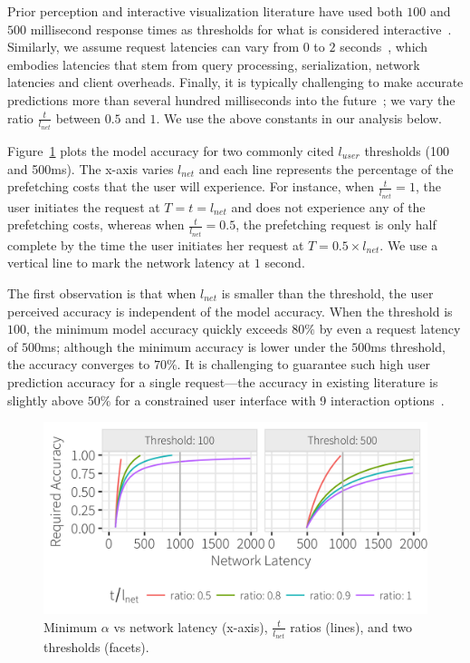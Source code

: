 Prior perception and interactive visualization literature have used both $100$ and $500$ millisecond response times as thresholds for what is considered interactive~\cite{liu2014effects}.   Similarly, we assume request latencies can vary from $0$ to $2$ seconds~\cite{}, which embodies latencies that stem from query processing, serialization, network latencies and client overheads.  Finally, it is typically challenging to make accurate predictions more than several hundred milliseconds into the future~\cite{pasqual2014mouse}; we vary the ratio $\frac{t}{l_{net}}$ between $0.5$ and $1$.   We use the above constants in our analysis below.

Figure~\ref{fig:model_base} plots the model accuracy for two commonly cited $l_{user}$ thresholds (100 and 500ms).  The x-axis varies $l_{net}$ and each line represents the percentage of the prefetching costs that the user will experience.  For instance, when $\frac{t}{l_{net}}=1$, the user initiates the request at $T=t=l_{net}$ and does not experience any of the prefetching costs, whereas when $\frac{t}{l_{net}}=0.5$, the prefetching request is only half complete by the time the user initiates her request at $T=0.5\times l_{net}$.  We use a vertical line to mark the network latency at $1$ second.  

The first observation is that when $l_{net}$ is smaller than the threshold, the user perceived accuracy is independent of the model accuracy.  When the threshold is $100$, the minimum model accuracy quickly exceeds $80\%$ by even a request latency of $500$ms; although the minimum accuracy is lower under the $500$ms threshold, the accuracy converges to $70\%$.
It is challenging to guarantee such high user prediction accuracy for a single request---the accuracy in existing literature is slightly above $50\%$ for a constrained user interface with 9 interaction options~\cite{battle2016dynamic}.


\begin{figure}[ht]
	\centering
	\includegraphics[width=1\columnwidth]{figures/model_base}
 	\caption{Minimum $\alpha$ vs network latency (x-axis), $\frac{t}{l_{net}}$ ratios (lines), and two thresholds (facets).}
    \label{fig:model_base}
\end{figure}




